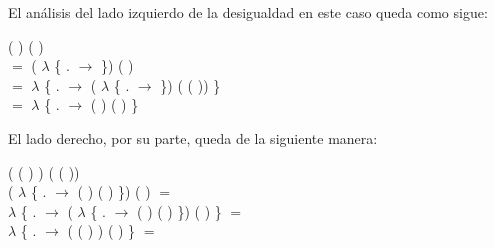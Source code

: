 \begin{AgdaAlign}
El análisis del lado izquierdo de la desigualdad en este caso queda como sigue:

 (  \AgdaFunction{+} ) ( \AgdaFunction{+}  ) \\
$=$  ( $\lambda$ \{ . $\rightarrow$   \AgdaFunction{+}  \}) ( ) \\
$=$  $\lambda$ \{ . $\rightarrow$  ( $\lambda$ \{ . $\rightarrow$   \AgdaFunction{+}  \}) ( ( )) \} \\
$=$  $\lambda$ \{ . $\rightarrow$  (  \AgdaFunction{+} ) ( ) \} 

El lado derecho, por su parte, queda de la siguiente manera:

\begin{flushright}
( ( ) ) \AgdaFunction{+} (  ( ))\\ 
( $\lambda$ \{ . $\rightarrow$  ( ) ( ) \}) \AgdaFunction{+} ( ) $=$ \\
 $\lambda$ \{ . $\rightarrow$ ( $\lambda$ \{ . $\rightarrow$  ( ) ( ) \}) \AgdaFunction{+} ( ) \}  $=$  \\
 $\lambda$ \{ . $\rightarrow$ ( ( )  )  \AgdaFunction{+} ( ) \} $=$
\end{flushright} 


\end{AgdaAlign}
